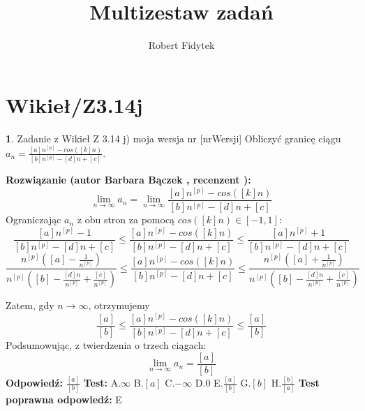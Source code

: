 \documentclass[12pt, a4paper]{article}
\title{Multizestaw zadań}
\author{Robert Fidytek}
\date{}
\theoremstyle{definition} %
\newtheorem{zad}{}
\newcommand{\kategoria}[1]{\section{#1}} %
\newcommand{\zadStart}[1]{\begin{zad}#1\newline} %
\newcommand{\zadStop}{\end{zad}}   %
\newcommand{\rozwStart}[2]{\noindent \textbf{Rozwiązanie (autor #1 , recenzent #2): }\newline} %
\newcommand{\rozwStop}{\newline}                                            %
\newcommand{\odpStart}{\noindent \textbf{Odpowiedź:}\newline}    %
\newcommand{\odpStop}{\newline}                                             %
\newcommand{\testStart}{\noindent \textbf{Test:}\newline} %
\newcommand{\testStop}{\newline} %
\newcommand{\kluczStart}{\noindent \textbf{Test poprawna odpowiedź:}\newline} %
\newcommand{\kluczStop}{\newline} %
\begin{document}
\maketitle


\kategoria{Wikieł/Z3.14j}
\zadStart{Zadanie z Wikieł Z 3.14 j) moja wersja nr [nrWersji]}
Obliczyć granicę ciągu $a_n= \frac{[a]n^{[p]} - cos([k]n)}{[b]n^{[p]} - [d]n +[c]}$.
\zadStop
\rozwStart{Barbara Bączek}{}
$$\lim_{n \rightarrow \infty} a_n= \lim_{n \rightarrow \infty} \frac{[a]n^{[p]} - cos([k]n)}{[b]n^{[p]} - [d]n +[c]}$$
Ograniczając $a_n$ z obu stron za pomocą $cos([k]n) \in [-1,1]$:
$$  \frac{[a]n^{[p]} - 1}{[b]n^{[p]} - [d]n +[c]}  \leq  \frac{[a]n^{[p]} - cos([k]n)}{[b]n^{[p]} - [d]n +[c]} \leq  \frac{[a]n^{[p]} +1}{[b]n^{[p]} - [d]n +[c]}  $$
$$\frac{n^{[p]}([a] - \frac{1}{n^{[p]}})}{n^{[p]}([b] - \frac{[d]n}{n^{[p]}} + \frac{[c]}{n^{[p]}})}  \leq  \frac{[a]n^{[p]} - cos([k]n)}{[b]n^{[p]} - [d]n +[c]} \leq  \frac{n^{[p]}([a] + \frac{1}{n^{[p]}})}{n^{[p]}([b] - \frac{[d]n}{n^{[p]}} + \frac{[c]}{n^{[p]}})}  $$

Zatem, gdy $n \rightarrow \infty$, otrzymujemy
$$ \frac{[a]}{[b]} \leq \frac{[a]n^{[p]} - cos([k]n)}{[b]n^{[p]} - [d]n +[c]} \leq \frac{[a]}{[b]} $$
Podsumowując, z twierdzenia o trzech ciągach:  $$\lim_{n \rightarrow \infty} a_n= \frac{[a]}{[b]}$$
\rozwStop
\odpStart
$\frac{[a]}{[b]}$
\odpStop
\testStart
A.$\infty$
B.$[a]$
C.$-\infty$
D.$0$
E.$\frac{[a]}{[b]}$
G.$[b]$
H.$\frac{[b]}{[a]}$
\testStop
\kluczStart
E
\kluczStop
\end{document}
